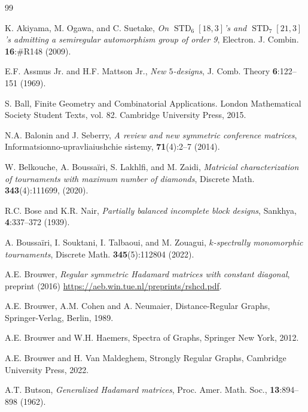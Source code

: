 \documentclass[11pt]{article}
\begin{document}
\begin{thebibliography}{99}

K. Akiyama, M. Ogawa, and C. Suetake, 
\emph{On $\operatorname{STD}_6[18, 3]$’s and $\operatorname{STD}_7[21, 3]$’s admitting a semiregular automorphism group of order 9}, 
Electron. J. Combin. \textbf{16}:\#R148 (2009).

E.F. Assmus Jr. and H.F. Mattson Jr., 
\emph{New $5$-designs}, J. Comb. Theory {\bf 6}:122--151 (1969).

S. Ball, Finite Geometry and Combinatorial Applications. London Mathematical Society Student Texts, vol. 82. Cambridge University Press, 2015.


N.A. Balonin and J. Seberry, \textit{A review and new symmetric conference matrices},  Informatsionno-upravliaiushchie sistemy, \textbf{71}(4):2--7 (2014).

W. Belkouche, A. Boussa\"{i}ri, S. Lakhlfi, and M. Zaidi, 
\emph{Matricial characterization of tournaments with maximum
number of diamonds}, Discrete Math. {\bf343}(4):111699, (2020). 

R.C. Bose and K.R. Nair, 
\textit{Partially balanced incomplete block designs}, 
Sankhya, \textbf{4}:337--372 (1939).

A. Boussa\"{i}ri, I. Souktani, I. Talbaoui, and M. Zouagui, 
\textit{$k$-spectrally monomorphic tournaments}, 
Discrete Math. \textbf{345}(5):112804 (2022).

A.E. Brouwer, \emph{Regular symmetric Hadamard matrices with constant diagonal}, preprint (2016) \url{https://aeb.win.tue.nl/preprints/rshcd.pdf}.

A.E. Brouwer, A.M. Cohen and A. Neumaier, Distance-Regular Graphs, Springer-Verlag, Berlin, 1989.


A.E. Brouwer and W.H. Haemers, Spectra of Graphs, Springer New York, 2012.

A.E. Brouwer and H. Van Maldeghem, Strongly Regular Graphs, Cambridge University Press, 2022.

A.T. Butson, \emph{Generalized Hadamard matrices}, Proc. Amer. Math. Soc., \textbf{13}:894--898 (1962).




\end{thebibliography}
\end{document}
